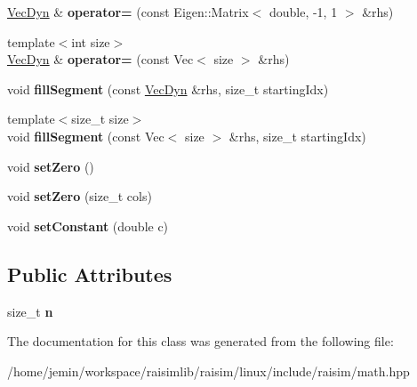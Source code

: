 \begin{DoxyCompactItemize}
\hyperlink{classraisim_1_1VecDyn}{Vec\+Dyn} \& {\bfseries operator=} (const Eigen\+::\+Matrix$<$ double, -\/1, 1 $>$ \&rhs)
\item 
\mbox{\label{classraisim_1_1VecDyn_a6cde6c565ff2399626d3f08adb7c9f3d}} 
{\footnotesize template$<$int size$>$ }\\\hyperlink{classraisim_1_1VecDyn}{Vec\+Dyn} \& {\bfseries operator=} (const Vec$<$ size $>$ \&rhs)
\item 
\mbox{\label{classraisim_1_1VecDyn_a910043c63b9c8bf8a5f2178030e4f646}} 
void {\bfseries fill\+Segment} (const \hyperlink{classraisim_1_1VecDyn}{Vec\+Dyn} \&rhs, size\+\_\+t starting\+Idx)
\item 
\mbox{\label{classraisim_1_1VecDyn_af2e893881e6d1311c7184d61e3292d97}} 
{\footnotesize template$<$size\+\_\+t size$>$ }\\void {\bfseries fill\+Segment} (const Vec$<$ size $>$ \&rhs, size\+\_\+t starting\+Idx)
\item 
\mbox{\label{classraisim_1_1VecDyn_abad05ba455f747903ae24dc850c446fc}} 
void {\bfseries set\+Zero} ()
\item 
\mbox{\label{classraisim_1_1VecDyn_a94e16280bc450b01d77964ab9dd89b99}} 
void {\bfseries set\+Zero} (size\+\_\+t cols)
\item 
\mbox{\label{classraisim_1_1VecDyn_a33c39bb8f28ea62066f1f5cc3c5b4376}} 
void {\bfseries set\+Constant} (double c)
\end{DoxyCompactItemize}
\subsection*{Public Attributes}
\begin{DoxyCompactItemize}
\item 
\mbox{\label{classraisim_1_1VecDyn_a41d1439610c693346f559ccf3feecd9a}} 
size\+\_\+t {\bfseries n}
\end{DoxyCompactItemize}


The documentation for this class was generated from the following file\+:\begin{DoxyCompactItemize}
\item 
/home/jemin/workspace/raisimlib/raisim/linux/include/raisim/math.\+hpp\end{DoxyCompactItemize}

